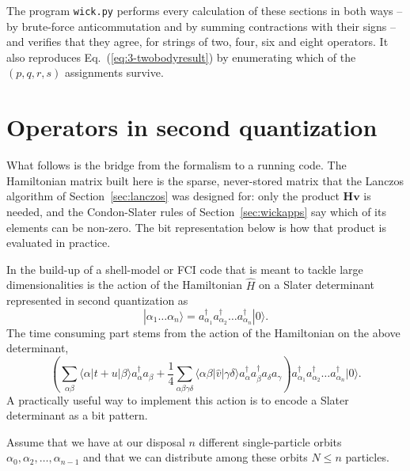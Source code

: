 The program \texttt{wick.py} performs every calculation of these sections in
both ways -- by brute-force anticommutation and by summing contractions with
their signs -- and verifies that they agree, for strings of two, four, six and
eight operators.  It also reproduces Eq.~(\ref{eq:3-twobodyresult}) by
enumerating which of the $(p,q,r,s)$ assignments survive.

\section{Operators in second quantization}
\label{sec:bitrep}

What follows is the bridge from the formalism to a running code.  The
Hamiltonian matrix built here is the sparse, never-stored matrix that the
Lanczos algorithm of Section~\ref{sec:lanczos} was designed for: only the
product $\bm{H}\bm{v}$ is needed, and the Condon-Slater rules of
Section~\ref{sec:wickapps} say which of its elements can be non-zero.  The bit
representation below is how that product is evaluated in practice.


In the build-up of a shell-model or FCI code that is meant to tackle large dimensionalities
is the action of the Hamiltonian $\hat{H}$ on a
Slater determinant represented in second quantization as
\[
 |\alpha_1\dots \alpha_n\rangle = a_{\alpha_1}^{\dagger} a_{\alpha_2}^{\dagger} \dots a_{\alpha_n}^{\dagger} |0\rangle.
\]
The time consuming part stems from the action of the Hamiltonian
on the above determinant,
\[
\left(\sum_{\alpha\beta} \langle \alpha|t+u|\beta\rangle a_\alpha^{\dagger} a_\beta + \frac{1}{4} \sum_{\alpha\beta\gamma\delta}
                \langle \alpha \beta|\hat{v}|\gamma \delta\rangle a_\alpha^{\dagger} a_\beta^{\dagger} a_\delta a_\gamma\right)a_{\alpha_1}^{\dagger} a_{\alpha_2}^{\dagger} \dots a_{\alpha_n}^{\dagger} |0\rangle.
\]
A practically useful way to implement this action is to encode a Slater determinant as a bit pattern.

Assume that we have at our disposal $n$ different single-particle orbits
$\alpha_0,\alpha_2,\dots,\alpha_{n-1}$ and that we can distribute  among these orbits $N\le n$ particles.

